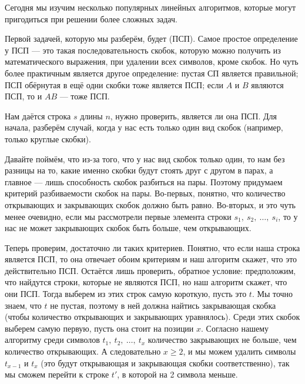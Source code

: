 Сегодня мы изучим несколько популярных линейных алгоритмов, которые могут пригодиться при решении более сложных задач.


Первой задачей, которую мы разберём, будет  (ПСП). Самое простое определение у ПСП — это такая последовательность скобок, которую можно получить из математического выражения, при удалении всех символов, кроме скобок. Но чуть более практичным является другое определение: пустая СП является правильной; ПСП обёрнутая в ещё одни скобки тоже является ПСП; если $A$ и $B$ являются ПСП, то и $AB$ — тоже ПСП.

Нам даётся строка $s$ длины $n$, нужно проверить, является ли она ПСП. Для начала, разберём случай, когда у нас есть только один вид скобок (например, только круглые скобки).

Давайте поймём, что из-за того, что у нас вид скобок только один, то нам без разницы на то, какие именно скобки будут стоять друг с другом в парах, а главное — лишь способность скобок разбиться на пары. Поэтому придумаем критерий разбиваемости скобок на пары. Во-первых, понятно, что количество открывающих и закрывающих скобок должно быть равно. Во-вторых, и это чуть менее очевидно, если мы рассмотрели первые элемента строки $s_1,\ s_2,\ \ldots,\ s_i$, то у нас не может закрывающих скобок быть больше, чем открывающих. 

Теперь проверим, достаточно ли таких критериев. Понятно, что если наша строка является ПСП, то она отвечает обоим критериям и наш алгоритм скажет, что это действительно ПСП. Остаётся лишь проверить, обратное условие: предположим, что найдутся строки, которые не являются ПСП, но наш алгоритм скажет, что они ПСП. Тогда выберем из этих строк самую короткую, пусть это $t$. Мы точно знаем, что $t$ не пустая, поэтому в ней должна найтись закрывающая скобка (чтобы количество открывающих и закрывающих уравнялось). Среди этих скобок выберем самую первую, пусть она стоит на позиции $x$. Согласно нашему алгоритму среди символов $t_1,\ t_2,\ \ldots,\ t_x$ количество закрывающих не больше, чем количество открывающих. А следовательно $x \geq 2$, и мы можем удалить символы $t_{x - 1}$ и $t_x$ (это будут открывающая и закрывающая скобки соответственно), так мы сможем перейти к строке $t'$, в которой на 2 символа меньше.

